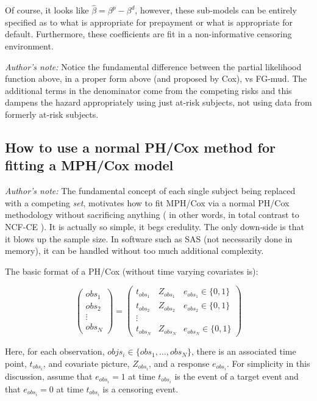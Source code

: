 \documentclass[10pt]{article}
\begin{document}
Of course, it looks like $\hat{\beta}=\beta^p-\beta^d$, however, these sub-models can be entirely specified as to what is appropriate for prepayment or what is
appropriate for default. Furthermore, these coefficients are fit in a non-informative censoring environment.


{\em Author's note:} Notice the fundamental difference between the partial likelihood function above, in a proper form above (and proposed
by Cox), vs FG-mud.
The additional terms in the denominator come from the competing risks and this dampens the hazard appropriately using just at-risk subjects,
not using data from formerly at-risk subjects.



\subsection{How to use a normal PH/Cox method for fitting a MPH/Cox model}

{\em Author's note:}  The fundamental concept of each single subject being replaced with a competing {\em set}, motivates how to fit MPH/Cox via a normal PH/Cox
methodology without sacrificing anything ( in other words, in total contrast to NCF-CE ).  It is actually so simple, it begs credulity.
The only down-side is that it blows up the sample size.  In software such as SAS (not necessarily done in memory), it can be handled without too
much additional complexity.


The basic format of a PH/Cox (without time varying covariates is):


\begin{equation*}
\begin{pmatrix}
obs_1 \\
obs_2 \\
\vdots \\
obs_N
\end{pmatrix}
=
\begin{pmatrix}
    t_{obs_1} & Z_{obs_1} & e_{obs_1} \in \{0, 1\} \\
    t_{obs_2} & Z_{obs_2} & e_{obs_2} \in \{0, 1\} \\
\vdots \\
    t_{obs_N} & Z_{obs_N} & e_{obs_N} \in \{0, 1\} 
\end{pmatrix}
\end{equation*}

Here, for each observation, $objs_i \in \{obs_1, \ldots, obs_N\}$, there is an associated time point, $t_{obs_i}$, and covariate picture,
$Z_{obs_i}$, and
a response $e_{obs_i}$.  For simplicity in this discussion, assume that $e_{obs_i}=1$ at time $t_{obs_i}$ is the event of a target event and that $e_{obs_i}=0$
at time $t_{obs_i}$ is a censoring event.
\end{document}
